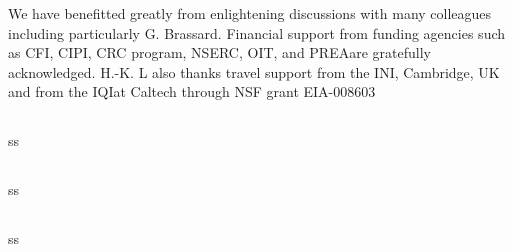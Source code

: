 We have benefitted greatly from enlightening discussions with many colleagues including particularly G. Brassard. Financial support from funding agencies such as CFI, CIPI, CRC program, NSERC, OIT, and PREAare gratefully acknowledged. H.-K. L also thanks travel support from the INI, Cambridge, UK and from the IQIat Caltech through NSF grant EIA-008603

\subsection{\trnas}
ss
\subsection{\review}
ss
\subsection{\dic}
ss